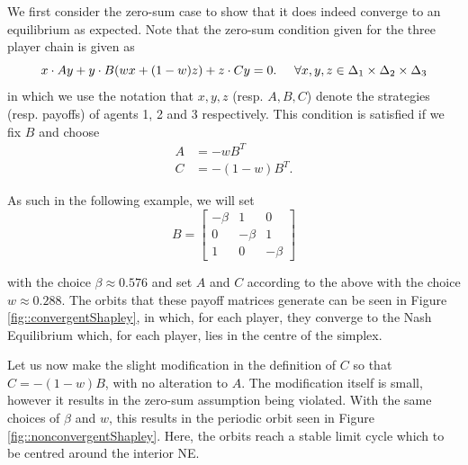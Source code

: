 \documentclass{article}
\theoremstyle{definition}
\begin{document}
  We first consider the zero-sum case to show that it does indeed converge to an equilibrium as expected. Note that the zero-sum condition given for the three player chain is given as
%
  \begin{equation}
    x \cdot A y + y \cdot B (w x + (1-w)z) + z \cdot C y = 0. \hspace{0.5cm} \forall x, y, z \in \Delta_1 \times \Delta_2 \times \Delta_3
  \end{equation}
  in which we use the notation that $x, y, z$ (resp. $A, B, C$) denote the strategies (resp. payoffs) of agents 1, 2 and 3 respectively. This condition is satisfied if we fix $B$ and choose
%
  \begin{align} \label{eq::zeroSumShapley}
    A & = - w B^T \nonumber \\
    C & = - (1 - w) B^T. 
  \end{align}

  As such in the following example, we will set
  \begin{equation}
    B =  \begin{bmatrix}
      - \beta & 1 & 0 \\
      0 & -\beta & 1 \\
      1 & 0 & -\beta
    \end{bmatrix}
  \end{equation}
  
  with the choice $\beta \approx 0.576$ and set $A$ and $C$ according to the above with the choice $w \approx 0.288$. The orbits that these payoff matrices generate can be seen in Figure \ref{fig::convergentShapley}, in which, for each player, they converge to the Nash Equilibrium which, for each player, lies in the centre of the simplex.

  Let us now make the slight modification in the definition of $C$ so that
    $C  = - (1 - w) B$, 
  with no alteration to $A$. The modification itself is small, however it results in the zero-sum
  assumption being violated. With the same choices of $\beta$ and $w$, this results in the periodic
  orbit seen in Figure \ref{fig::nonconvergentShapley}. Here,
  the orbits reach a stable limit cycle which to be centred around the interior NE.
\end{document}
